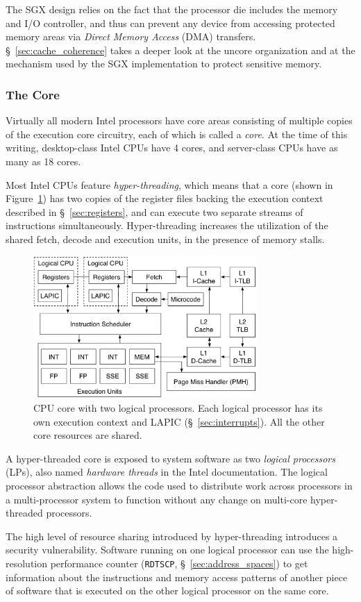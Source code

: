 The SGX design relies on the fact that the processor die includes the memory
and I/O controller, and thus can prevent any device from accessing protected
memory areas via \textit{Direct Memory Access} (DMA) transfers.
\S~\ref{sec:cache_coherence} takes a deeper look at the uncore organization and
at the mechanism used by the SGX implementation to protect sensitive memory.


\subsubsection{The Core}
\label{sec:cpu_core}

Virtually all modern Intel processors have core areas consisting of multiple
copies of the execution core circuitry, each of which is called a
\textit{core}.  At the time of this writing, desktop-class Intel CPUs have 4
cores, and server-class CPUs have as many as 18 cores.

Most Intel CPUs feature \textit{hyper-threading}, which means that a core
(shown in Figure~\ref{fig:cpu_core}) has two copies of the register files
backing the execution context described in \S~\ref{sec:registers}, and can
execute two separate streams of instructions simultaneously. Hyper-threading
increases the utilization of the shared fetch, decode and execution units, in
the presence of memory stalls.

\begin{figure}[hbt]
  \centering
  \includegraphics[width=85mm]{figures/cpu_core.pdf}
  \caption{
    CPU core with two logical processors. Each logical processor has its own
    execution context and LAPIC (\S~\ref{sec:interrupts}). All the other core
    resources are shared.
  }
  \label{fig:cpu_core}
\end{figure}

A hyper-threaded core is exposed to system software as two \textit{logical
processors} (LPs), also named \textit{hardware threads} in the Intel
documentation.  The logical processor abstraction allows the code used to
distribute work across processors in a multi-processor system to function
without any change on multi-core hyper-threaded processors.

The high level of resource sharing introduced by hyper-threading introduces a
security vulnerability. Software running on one logical processor can use the
high-resolution performance counter (\texttt{RDTSCP},
\S~\ref{sec:address_spaces}) \cite{petters1999making} to get information about
the instructions and memory access patterns of another piece of software that
is executed on the other logical processor on the same core.
